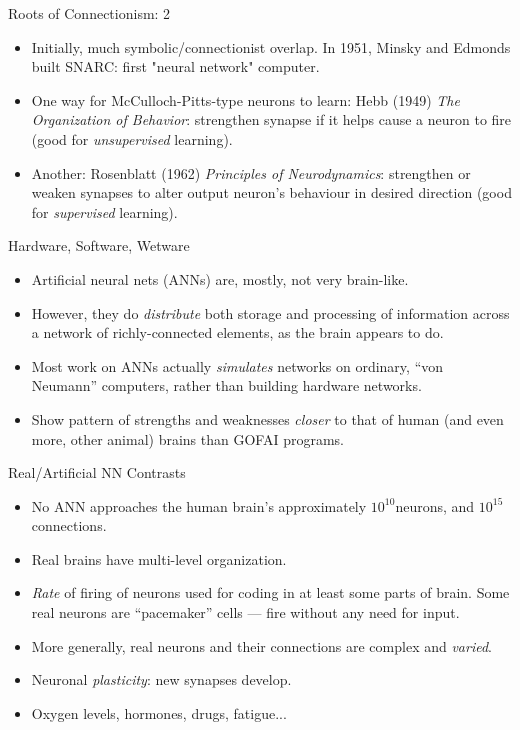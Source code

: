 \documentclass{article}
\begin{document}
\begin{slide}{}
{\Large Roots of Connectionism: 2}
\begin{itemize}
\item Initially, much symbolic/connectionist overlap. In 1951,
Minsky and Edmonds built SNARC: first "neural network"
computer.
\item One way for McCulloch-Pitts-type neurons to learn: Hebb
(1949) {\em The Organization of Behavior}: strengthen synapse if it
helps cause a neuron to fire (good for {\em unsupervised}
learning). 
\item Another: Rosenblatt (1962) {\em Principles of Neurodynamics}:
strengthen or weaken synapses to alter output neuron's behaviour in
desired direction (good for {\em supervised} learning).
\end{itemize}
\end{slide}

\begin{slide}{}
{\Large Hardware, Software, Wetware}
\begin{itemize}
\item Artificial neural nets (ANNs) are, mostly, not very
brain-like. 
\item However, they do {\em distribute} both storage and
processing of information across a network of richly-connected
elements, as the brain appears to do.
\item Most work on ANNs actually {\em simulates} networks on ordinary,
``von Neumann'' computers, rather than building hardware networks.
\item Show pattern of strengths and weaknesses {\em closer} to that of
human (and even more, other animal) brains than GOFAI programs.
\end{itemize}
\end{slide}

\begin{slide}{}
{\Large Real/Artificial NN Contrasts}
\begin{itemize}
\item No ANN approaches the human brain's approximately
$10^{10}$\space neurons, and $10^{15}$\space connections.
\item Real brains have multi-level
organization.
\item {\em Rate} of firing of neurons used for coding in at least some
parts of brain. Some real neurons are ``pacemaker'' cells --- fire without any
need for input.
\item More generally, real neurons and their connections are complex
and {\em varied}.
\item Neuronal {\em plasticity}: new synapses develop.
\item Oxygen levels, hormones, drugs, fatigue...
\end{itemize}
\end{slide}
\end{document}
